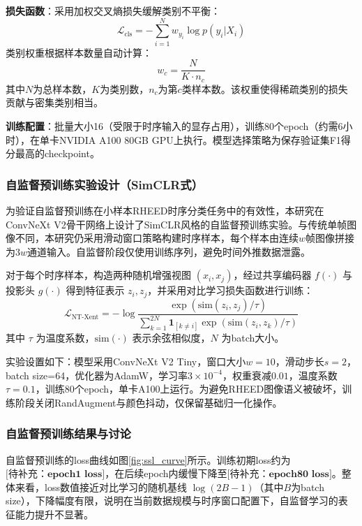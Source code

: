 \textbf{损失函数}：采用加权交叉熵损失缓解类别不平衡：
\begin{equation}
\mathcal{L}_{\text{cls}} = -\sum_{i=1}^{N} w_{y_i} \log p(y_i | X_i)
\end{equation}
类别权重根据样本数量自动计算：
\begin{equation}
w_c = \frac{N}{K \cdot n_c}
\end{equation}
其中$N$为总样本数，$K$为类别数，$n_c$为第$c$类样本数。该权重使得稀疏类别的损失贡献与密集类别相当。

\textbf{训练配置}：批量大小16（受限于时序输入的显存占用），训练80个epoch（约需6小时），在单卡NVIDIA A100 80GB GPU上执行。模型选择策略为保存验证集F1得分最高的checkpoint。

\subsubsection{自监督预训练实验设计（SimCLR式）}
为验证自监督预训练在小样本RHEED时序分类任务中的有效性，本研究在ConvNeXt V2骨干网络上设计了SimCLR风格的自监督预训练实验。与传统单帧图像不同，本研究仍采用滑动窗口策略构建时序样本，每个样本由连续$w$帧图像拼接为$3w$通道输入。自监督阶段仅使用训练序列，避免时间外推数据泄露。

对于每个时序样本，构造两种随机增强视图 $(x_i, x_j)$，经过共享编码器 $f(\cdot)$ 与投影头 $g(\cdot)$ 得到特征表示 $z_i, z_j$，并采用对比学习损失函数进行训练：
\begin{equation}
\mathcal{L}_{\text{NT-Xent}} = -\log \frac{\exp(\text{sim}(z_i, z_j)/\tau)}{\sum_{k=1}^{2N}\mathbf{1}_{[k\neq i]}\exp(\text{sim}(z_i, z_k)/\tau)}
\end{equation}
其中 $\tau$ 为温度系数，$\text{sim}(\cdot)$ 表示余弦相似度，$N$ 为batch大小。

实验设置如下：模型采用ConvNeXt V2 Tiny，窗口大小$w=10$，滑动步长$s=2$，batch size=64，优化器为AdamW，学习率$3\times 10^{-4}$，权重衰减$0.01$，温度系数$\tau=0.1$，训练80个epoch，单卡A100上运行。为避免RHEED图像语义被破坏，训练阶段关闭RandAugment与颜色抖动，仅保留基础归一化操作。

\subsubsection{自监督预训练结果与讨论}
自监督预训练的loss曲线如图\ref{fig:ssl_curve}所示。训练初期loss约为$\textbf{[待补充：epoch1 loss]}$，在后续epoch内缓慢下降至$\textbf{[待补充：epoch80 loss]}$。整体来看，loss数值接近对比学习的随机基线 $\log(2B-1)$（其中$B$为batch size），下降幅度有限，说明在当前数据规模与时序窗口配置下，自监督学习的表征能力提升不显著。

